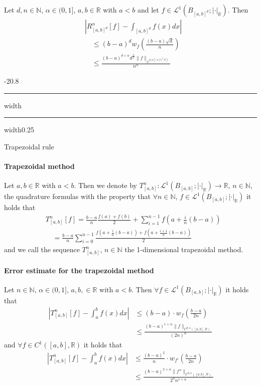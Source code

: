 \documentclass[a4paper,landscape,7pt,fleqn]{scrartcl}
\makeatletter
\renewcommand{\subsection}{\@startsection{subsection}{1}{0mm}%
{-2\baselineskip}{0.8\baselineskip}%
{\hrule depth 0.2pt width\columnwidth\hrule depth0.75pt
width0.25\columnwidth\vspace*{1.2em}\large\bfseries}}
\makeatother
\begin{document}
\begin{multicols*}{3}
Let $d,n \in \mathbb{N}$, $\alpha \in (0,1]$, $a,b \in \mathbb{R}$ with $a < b$ and let $f \in \mathcal{L}^1(B_{[a,b]^d}; | \cdot |_\mathbb{R})$. Then
\begin{align*}
& \left\lvert R^n_{[a,b]^d}[f] - \int_{[a,b]^d} f(x) dx \right\rvert \\
& \quad \leq (b-a)^d w_f \left( \frac{(b-a) \sqrt{d}}{n} \right) \\
& \quad \leq \frac{(b-a)^{d + \alpha} d^{\frac{\alpha}{2}} \| f \|_{C^{0,\alpha([a,b]^d, \mathbb{R})}}}{n^\alpha}
\end{align*}

\subsection{Trapezoidal rule}

\paragraph{Trapezoidal method}

Let $a,b \in \mathbb{R}$ with $a < b$. Then we denote by $T^n_{[a,b]} : \mathcal{L}^1(B_{[a,b]}; | \cdot |_\mathbb{R}) \rightarrow \mathbb{R}$, $n \in \mathbb{N}$, the quadrature formulas with the property that $\forall n \in \mathbb{N}$, $f \in \mathcal{L}^1(B_{[a,b]}; | \cdot |_\mathbb{R})$ it holds that
\begin{align*}
& T^n_{[a,b]}[f] = \frac{b-a}{n} \frac{f(a) + f(b)}{2} + \sum_{i=1}^{n-1} f \left( a + \frac{i}{n} (b-a) \right) \\
& \quad = \frac{b-a}{n} \sum_{i=0}^{n-1} \frac{f \left( a + \frac{i}{n} (b-a) \right) + f \left( a + \frac{i+1}{n} (b-a) \right)}{2}
\end{align*}
and we call the sequence $T^n_{[a,b]}$, $n \in \mathbb{N}$ the 1-dimensional trapezoidal method.

\paragraph{Error estimate for the trapezoidal method}

Let $n \in \mathbb{N}$, $\alpha \in (0,1]$, $a,b, \in \mathbb{R}$ with $a < b$. Then $\forall f \in \mathcal{L}^1(B_{[a,b]}; | \cdot |_\mathbb{R})$ it holds that
\begin{align*}
\left\lvert T^n_{[a,b]}[f] - \int_a^b f(x) dx \right\rvert &\leq (b-a) \cdot w_f \left( \frac{b-a}{2n} \right) \\
& \leq \frac{(b-a)^{1+\alpha} \| f \|_{C^{0,\alpha}([a,b],\mathbb{R})}}{(2n)^\alpha}
\end{align*}
and $\forall f \in C^1([a,b],\mathbb{R})$ it holds that
\begin{align*}
\left\lvert T^n_{[a,b]}[f] - \int_a^b f(x) dx \right\rvert &\leq \frac{(b-a)^2}{n} \cdot w_{f'} \left( \frac{b-a}{2n} \right) \\
& \leq \frac{(b-a)^{2+\alpha} \| f'' \|_{C^{0,\alpha}([a,b],\mathbb{R})}}{2^\alpha n^{1+\alpha}}
\end{align*}


\end{multicols*}
\end{document}

